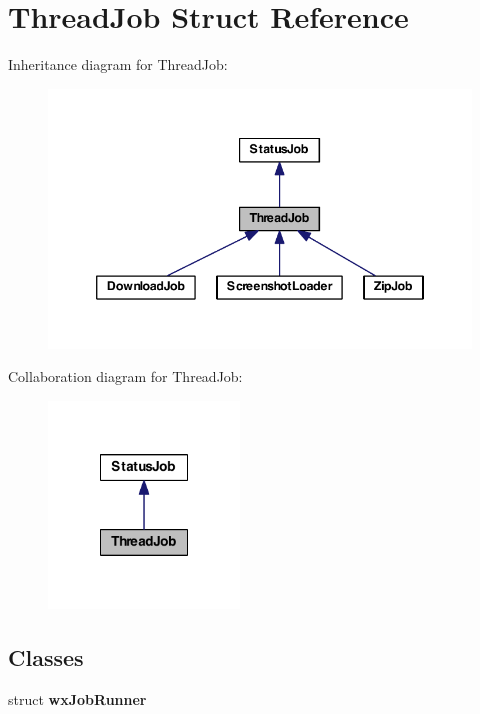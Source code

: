 \hypertarget{struct_thread_job}{\section{Thread\-Job Struct Reference}
\label{struct_thread_job}
}


Inheritance diagram for Thread\-Job\-:
\nopagebreak
\begin{figure}[H]
\begin{center}
\leavevmode
\includegraphics[width=346pt]{struct_thread_job__inherit__graph}
\end{center}
\end{figure}


Collaboration diagram for Thread\-Job\-:
\nopagebreak
\begin{figure}[H]
\begin{center}
\leavevmode
\includegraphics[width=144pt]{struct_thread_job__coll__graph}
\end{center}
\end{figure}
\subsection*{Classes}
\begin{DoxyCompactItemize}
\item 
struct {\bfseries wx\-Job\-Runner}
\end{DoxyCompactItemize}
